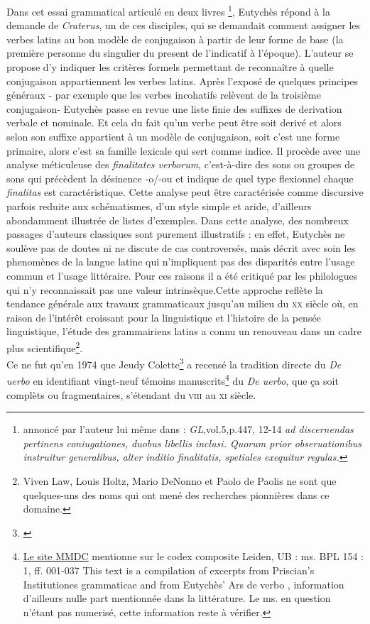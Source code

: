 \documentclass[a4paper, twoside, 12pt]{book}
\begin{document}
Dans cet essai grammatical articulé en deux livres \footnote{annoncé par l'auteur lui même dans : \textit{GL},vol.5,p.447, 12-14 \textit{ad discernendas pertinens coniugationes, duobus libellis inclusi. Quorum prior obseruationibus instruitur generalibus, alter inditio finalitatis, spetiales exequitur regulas.}}, Eutychès répond à la demande de \textit{Craterus}, un de ces disciples, qui se demandait comment assigner les verbes latins au bon modèle de conjugaison à partir de leur forme de base (la première personne du singulier du present de l'indicatif à l'époque). L'auteur se propose d'y indiquer les critères formels permettant de reconnaître à quelle conjugaison appartiennent les verbes latins. Après l'exposé de quelques principes généraux - par exemple que les verbes incohatifs relèvent de la troisième conjugaison- Eutychès passe en revue une liste finie des suffixes de derivation verbale et nominale. Et cela du fait qu'un verbe peut être soit derivé et alors selon son suffixe appartient à un modèle de conjugaison, soit c'est une forme primaire, alors c'est sa famille lexicale qui sert comme indice. Il procède avec une analyse méticuleuse des \textit{finalitates verborum}, c'est-à-dire des sons ou groupes de sons qui précèdent la désinence -o/-ou et indique de quel type flexionnel chaque \textit{finalitas} est caractéristique. Cette analyse peut être caractérisée comme discursive  parfois reduite aux schématismes, d'un style simple et aride, d'ailleurs abondamment illustrée de listes d’exemples. Dans cette analyse, des nombreux passages d'auteurs classiques sont purement illustratifs : en effet, Eutychès ne soulève pas de doutes ni ne discute de cas controversés, mais décrit avec soin les phenomènes de la langue latine qui n'impliquent pas des disparités entre l'usage commun et l'usage littéraire. Pour ces raisons il a été critiqué par les philologues qui n'y reconnaissait pas une valeur intrinsèque.Cette approche reflète la tendance générale aux travaux grammaticaux jusqu'au milieu du \textsc{xx}\ieme{} siècle où, en raison de l'intérêt croissant pour la linguistique et l'histoire de la pensée linguistique, l'étude des grammairiens latins a connu un renouveau dans un cadre plus scientifique\footnote{Viven Law, Louis Holtz, Mario DeNonno et Paolo de Paolis ne sont que quelques-uns des noms qui ont mené des recherches pionnières dans ce domaine.}. \\

Ce ne fut qu'en 1974 que Jeudy Colette\footnote{\cite{jeudy1974manuscrits}} a recensé la tradition directe du \textit{De uerbo} en identifiant vingt-neuf témoins manuscrits\footnote {\href{http://www.mmdc.nl/static/site/index.html}{Le site MMDC} mentionne sur le codex composite Leiden, UB : ms. BPL 154 : 1, ff. 001-037 \og{} This text is a compilation of excerpts from Priscian's Institutiones grammaticae and from Eutychès' Ars de verbo \fg{}, information d'ailleurs nulle part mentionnée dans la littérature. Le ms. en question n'étant pas numerisé, cette information reste à vérifier.} du \textit{De uerbo}, que ça soit complèts ou fragmentaires, s'étendant du \textsc{viii}\ieme{} au \textsc{xi}\ieme{} siècle.
\end{document}
